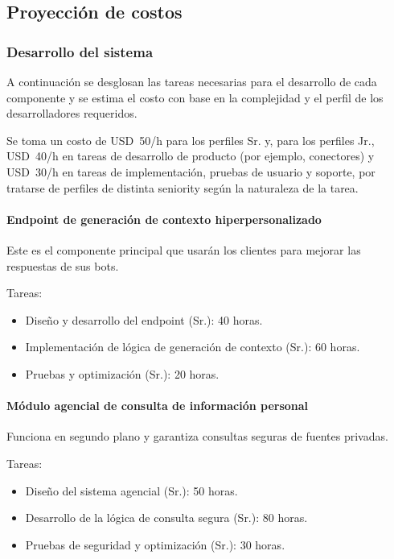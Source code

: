 \subsection{Proyección de costos}

\subsubsection{Desarrollo del sistema}

A continuación se desglosan las tareas necesarias para el desarrollo de cada componente y se estima el costo con base en la complejidad y el perfil de los desarrolladores requeridos.

Se toma un costo de USD~50/h para los perfiles Sr. y, para los perfiles Jr., USD~40/h en tareas de desarrollo de producto (por ejemplo, conectores) y USD~30/h en tareas de implementación, pruebas de usuario y soporte, por tratarse de perfiles de distinta seniority según la naturaleza de la tarea.

\paragraph{Endpoint de generación de contexto hiperpersonalizado}

Este es el componente principal que usarán los clientes para mejorar las respuestas de sus bots.

Tareas:
\begin{itemize}
    \item Diseño y desarrollo del endpoint (Sr.): 40 horas.
    \item Implementación de lógica de generación de contexto (Sr.): 60 horas.
    \item Pruebas y optimización (Sr.): 20 horas.
\end{itemize}

\paragraph{Módulo agencial de consulta de información personal}

Funciona en segundo plano y garantiza consultas seguras de fuentes privadas.

Tareas:
\begin{itemize}
    \item Diseño del sistema agencial (Sr.): 50 horas.
    \item Desarrollo de la lógica de consulta segura (Sr.): 80 horas.
    \item Pruebas de seguridad y optimización (Sr.): 30 horas.
\end{itemize}

